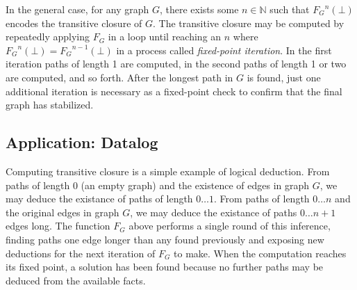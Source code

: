 \begin{center}
\end{center}

In the general case, for any graph $G$, there exists some $n \in \mathbb{N}$ such that ${F_G}^n(\bot)$ encodes the transitive closure of $G$. The transitive closure may be computed by repeatedly applying $F_G$ in a loop until reaching an $n$ where ${F_G}^n(\bot) = {F_G}^{n-1}(\bot)$ in a process called \textit{fixed-point iteration}. In the first iteration paths of length 1 are computed, in the second paths of length 1 or two are computed, and so forth. After the longest path in $G$ is found, just one additional iteration is necessary as a fixed-point check to confirm that the final graph has stabilized. 


\subsection{Application: Datalog}
\label{sec:ra:tc}
%
Computing transitive closure is a simple example of logical deduction. From paths of length $0$ (an empty graph) and the existence of edges in graph $G$, we may deduce the existance of paths of length $0 \ldots 1$. From paths of length $0 \ldots n$ and the original edges in graph $G$, we may deduce the existance of paths $0 \ldots n+1$ edges long. The function $F_G$ above performs a single round of this inference, finding paths one edge longer than any found previously and exposing new deductions for the next iteration of $F_G$ to make. When the computation reaches its fixed point, a solution has been found because no further paths may be deduced from the available facts.

